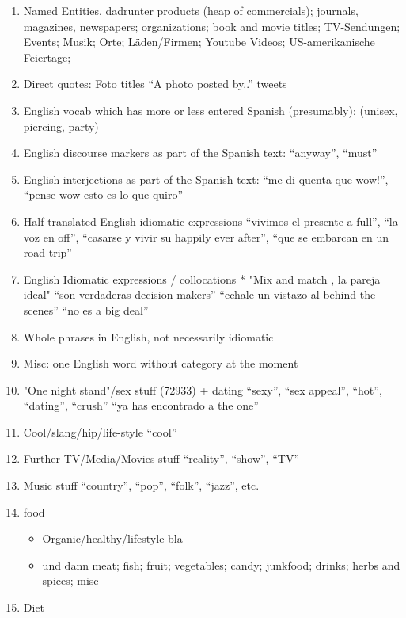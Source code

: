 \begin{enumerate}
  \item Named Entities, dadrunter products (heap of commercials); journals, magazines, newspapers; organizations; book and movie titles; TV-Sendungen; Events; Musik; Orte; Läden/Firmen; Youtube Videos; US-amerikanische Feiertage;
  \item Direct quotes:
      Foto titles ``A photo posted by..''
        tweets
  \item English vocab which has more or less entered Spanish (presumably): (unisex, piercing, party)
  \item English discourse markers as part of the Spanish text:
      ``anyway'', ``must''
  \item English interjections as part of the Spanish text:
      ``me di quenta que wow!'', ``pense wow esto es lo que quiro''
  \item Half translated English idiomatic expressions
      ``vivimos el presente a full'', ``la voz en off'', ``casarse y vivir su happily ever after'', ``que se embarcan en un road trip''
  \item English Idiomatic expressions / collocations
    * "Mix and match , la pareja ideal"
        ``son verdaderas decision makers''
        ``echale un vistazo al behind the scenes''
        ``no es a big deal''
  \item Whole phrases in English, not necessarily idiomatic %
  \item Misc: one English word without category at the moment
  \item "One night stand"/sex stuff (72933) + dating
      ``sexy'', ``sex appeal'', ``hot'', ``dating'', ``crush''
        ``ya has encontrado a the one''
  \item Cool/slang/hip/life-style
      ``cool''
  \item Further TV/Media/Movies stuff
      ``reality'', ``show'', ``TV''
  \item Music stuff
      ``country'', ``pop'', ``folk'', ``jazz'', etc.
  \item food
    \begin{itemize}
      \item Organic/healthy/lifestyle bla
      \item und dann meat; fish; fruit; vegetables; candy; junkfood; drinks; herbs and spices; misc
    \end{itemize}
  \item Diet
    \begin{itemize}

\end{itemize}
\end{enumerate}
